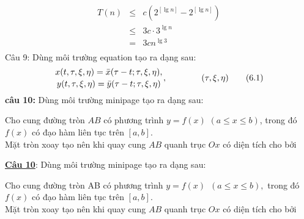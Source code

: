 \documentclass[12pt,a4paper]{book}
\theoremstyle{plain}%
\begin{document}
\begin{eqnarray}
T\left( n \right) & \le & c\left( {{2^{\left[ {\lg n} \right]}} - {2^{\left[ {\lg n} \right]}}} \right)\nonumber\\
 &\le & 3c \cdot {3^{\lg n}} \nonumber\\
 & = & 3c{n^{\lg 3}}\nonumber\\
 \nonumber
\end{eqnarray}
Câu 9: Dùng môi trường equation tạo ra dạng sau:\\
\begin{equation}
{x( {t,\tau ,\xi ,\eta })=  \bar x( {\tau  - t;\tau ,\xi ,\eta } ),
\atop
y( {t,\tau ,\xi ,\eta } ) = \bar  y( {\tau  - t;\tau ,\xi ,\eta } )},
\qquad\qquad(\tau,\xi,\eta)\tag{6.1}
\end{equation}
\textbf{câu 10:} Dùng môi trường minipage tạo ra dạng sau:\\
\begin{minipage}{8cm}
Cho cung đường tròn $AB$ có phương trình $y = f\left( x \right)$  $\left( {a \le x \le b} \right)$, trong đó $f\left( x \right)$ có đạo hàm liên tục trên $\left[ {a,b} \right]$.\\
Mặt tròn xoay tạo nên khi quay cung $AB$ quanh trục $Ox$ có diện tích cho bởi
\end{minipage}
\begin{minipage}[t]{5.2cm}
\end{minipage}
\vspace{6pt}\underline{\textbf{Câu 10}}: Dùng môi trường minipage tạo ra dạng sau:\\

\begin{minipage}{8cm}
Cho cung đường tròn AB có phương trình $y=f(x) \hspace{6pt}(a\le x\le b),$ trong đó $f(x)$ có đạo hàm liên tục trên $[a,b].$\\
Mặt tròn xoay tạo nên khi quay cung $AB$ quanh trục $Ox$ có diện tích cho bởi
\end{minipage}
\qquad\begin{minipage}[t]{5cm}
\parbox{8cm}{
}
\end{minipage}
\end{document}
